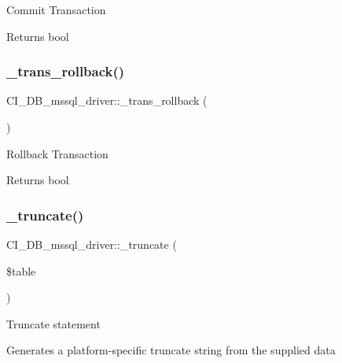 Commit Transaction

\begin{DoxyReturn}{Returns}
bool 
\end{DoxyReturn}
\mbox{\label{class_c_i___d_b__mssql__driver_a923f7b22eced04314ce7368ef7aafaed}} 
\subsubsection{\texorpdfstring{\+\_\+trans\+\_\+rollback()}{\_trans\_rollback()}}
{\footnotesize\ttfamily C\+I\+\_\+\+D\+B\+\_\+mssql\+\_\+driver\+::\+\_\+trans\+\_\+rollback (\begin{DoxyParamCaption}{ }\end{DoxyParamCaption})\hspace{0.3cm}{\ttfamily [protected]}}

Rollback Transaction

\begin{DoxyReturn}{Returns}
bool 
\end{DoxyReturn}
\mbox{\label{class_c_i___d_b__mssql__driver_a90385877323f193749fe162ca5e24a91}} 
\subsubsection{\texorpdfstring{\+\_\+truncate()}{\_truncate()}}
{\footnotesize\ttfamily C\+I\+\_\+\+D\+B\+\_\+mssql\+\_\+driver\+::\+\_\+truncate (\begin{DoxyParamCaption}\item[{}]{\$table }\end{DoxyParamCaption})\hspace{0.3cm}{\ttfamily [protected]}}

Truncate statement

Generates a platform-\/specific truncate string from the supplied data

